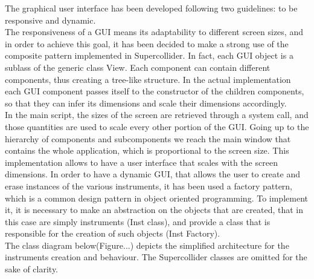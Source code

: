 \documentclass[main.tex]{subfiles}
\begin{document}
The graphical user interface has been developed following two guidelines: to be responsive and dynamic.\\
The responsiveness of a GUI means its adaptability to different screen sizes, and in order to achieve this goal, it has been decided to make a strong use of the composite pattern implemented in Supercollider. In fact, each GUI object is a sublass of the generic class View. Each component can contain different components, thus creating a tree-like structure. In the actual implementation each GUI component passes itself to the constructor of the children components, so that they can infer its dimensions and scale their dimensions accordingly.\\
 In the main script, the sizes of the screen are retrieved through a system call, and those quantities are used to scale every other portion of the GUI. Going up to the hierarchy of components and subcomponents we reach the main window that contains the whole application, which is proportional to the screen size. This implementation allows to have a user interface that scales with the screen dimensions.
In order to have a dynamic GUI, that allows the user to create and erase instances of the various instruments, it has been used a factory pattern, which is a common design pattern in object oriented programming. To implement it, it is necessary to make an abstraction on the objects that are created, that in this case are simply instruments (Inst class), and provide a class that is responsible for the creation of such objects (Inst Factory).\\
The class diagram below(Figure...) depicts the simplified architecture for the instruments creation and behaviour. The Supercollider classes are omitted for the sake of clarity.\\
\end{document}
